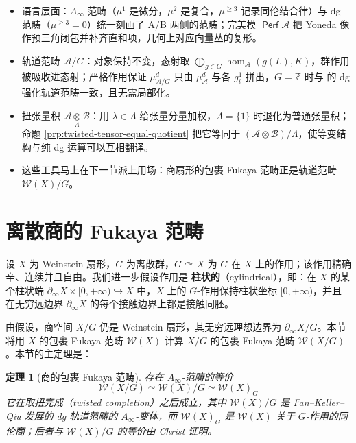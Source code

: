 \documentclass[11pt,a4paper]{article}
\renewcommand{\emph}[1]{{\bfseries #1}}
\DeclareMathOperator{\Perf}{\mathsf{Perf}}
\theoremstyle{cnth}
\newtheorem{thm}{定理}[section]
\newif\ifshowkey
\newenvironment{keytakeaways}{%
    \par\medskip
    \ifshowkey
        \begin{tcolorbox}[enhanced, breakable,
            colback=blue!3!white, colframe=blue!35!black,
            boxrule=0.5pt, arc=2pt, left=6pt, right=6pt, top=4pt, bottom=4pt,
            title={\small\textbf{本节重点}\quad{\footnotesize（译者所加）}},
            fonttitle=\bfseries, coltitle=black, colbacktitle=blue!10!white,
            toptitle=1pt, bottomtitle=1pt]
    \fi
    \begin{itemize}[leftmargin=1.4em,itemsep=0.15em,topsep=2pt]
}{%
    \end{itemize}%
    \ifshowkey
        \end{tcolorbox}%
    \fi
    \par\medskip
}
\begin{document}
\begin{keytakeaways}
\item 语言层面：$A_{\infty}$-范畴（$\mu^1$ 是微分，$\mu^2$ 是复合，$\mu^{\geq 3}$ 记录同伦结合律）与 dg 范畴（$\mu^{\geq 3}=0$）统一刻画了 A/B 两侧的范畴；完美模 $\Perf\mathcal{A}$ 把 Yoneda 像作预三角闭包并补齐直和项，几何上对应向量丛的复形。
\item 轨道范畴 $\mathcal{A}/G$：对象保持不变，态射取 $\bigoplus_{g\in G}\hom_{\mathcal{A}}(g(L),K)$，群作用被吸收进态射；严格作用保证 $\mu^d_{\mathcal{A}/G}$ 只由 $\mu^d_{\mathcal{A}}$ 与各 $g_i^1$ 拼出，$G=\mathbb{Z}$ 时与 \cite{FKQ24} 的 dg 强化轨道范畴一致，且无需局部化。
\item 扭张量积 $\mathcal{A}\underset{\Lambda}{\otimes}\mathcal{B}$：用 $\lambda\in\Lambda$ 给张量分量加权，$\Lambda=\{1\}$ 时退化为普通张量积；命题 \ref{prp:twisted-tensor-equal-quotient} 把它等同于 $(\mathcal{A}\otimes\mathcal{B})/\Lambda$，使等变结构与纯 dg 运算可以互相翻译。
\item 这些工具马上在下一节派上用场：商扇形的包裹 Fukaya 范畴正是轨道范畴 $\mathcal{W}(X)/G$。
\end{keytakeaways}

\section{离散商的 Fukaya 范畴\label{sec:Fukaya-category-discrete-quotient}}
设 $X$ 为 Weinstein 扇形，$G$ 为离散群，$G\curvearrowright X$ 为 $G$ 在 $X$ 上的作用；该作用精确辛、连续并且自由。我们进一步假设作用是 \emph{柱状的}（cylindrical），即：在 $X$ 的某个柱状端 $\partial_{\infty}X\times [0,+\infty)\hookrightarrow X$ 中，$X$ 上的 $G$-作用保持柱状坐标 $[0,+\infty)$，并且在无穷远边界 $\partial_{\infty} X$ 的每个接触边界上都是接触同胚。\par

由假设，商空间 $X/G$ 仍是 Weinstein 扇形，其无穷远理想边界为 $\partial_{\infty} X/G$。本节将用 $X$ 的包裹 Fukaya 范畴 $\mathcal{W} (X)$ 计算 $X/G$ 的包裹 Fukaya 范畴 $\mathcal{W} (X/G)$。本节的主定理是：

\begin{thm}[商的包裹 Fukaya 范畴]\label{thm:wrapped-Fukaya-quotient}
    存在 $A_{\infty}$-范畴的等价
    \[
        \mathcal{W} (X/G)\simeq\mathcal{W} (X)/G \simeq\mathcal{W}(X)_G
    \]
    它在取扭完成（twisted completion）之后成立，其中 $\mathcal{W} (X)/G$ 是 Fan--Keller--Qiu \cite{FKQ24} 发展的 dg 轨道范畴的 $A_{\infty}$-变体，而 $\mathcal{W}(X)_G$ 是 $\mathcal{W}(X)$ 关于 $G$-作用的同伦商；后者与 $\mathcal{W}(X)/G$ 的等价由 Christ \cite{Christ26} 证明。
\end{thm}
\end{document}
